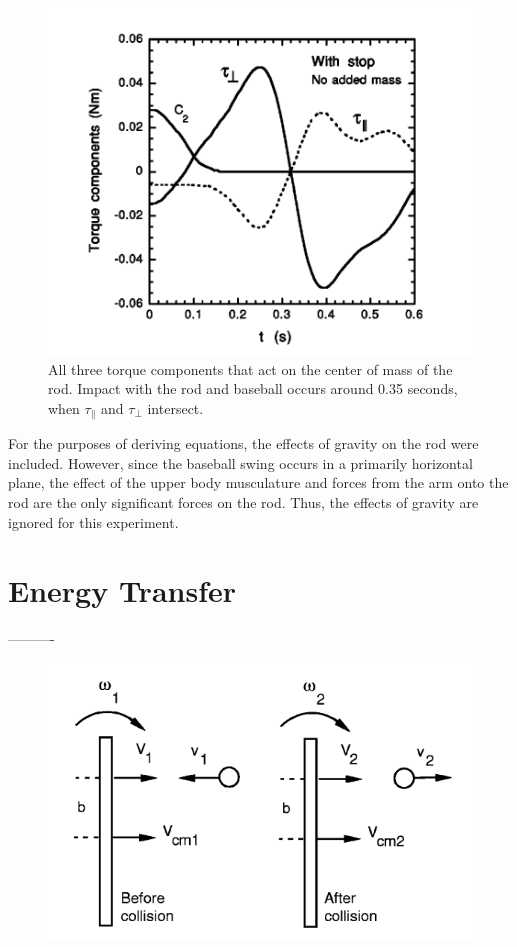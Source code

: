 \documentclass[%
 aip,
 amsmath,amssymb,
 reprint,%
 floatfix,%
]{revtex4-1}
\begin{document}
\begin{figure}[H]
	\centering
	\includegraphics[scale=0.4]{totaltorque.png}
	\caption{All three torque components that act on the center of mass of the rod. Impact with the rod and baseball occurs around 0.35 seconds, when $\tau_{\parallel}$ and $\tau_{\perp}$ intersect.}
\end{figure}

For the purposes of deriving equations, the effects of gravity on the rod were included. However, since the baseball swing occurs in a primarily horizontal plane, the effect of the upper body musculature and forces from the arm onto the rod are the only significant forces on the rod. Thus, the effects of gravity are ignored for this experiment.

\section{\label{sec:level5}Energy Transfer}

----------

\begin{figure}[H]
	\centering
	\includegraphics[scale=0.4]{momentumtransfer.png}
	\caption{}
\end{figure}
\end{document}

